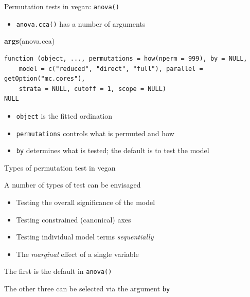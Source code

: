 \documentclass[10pt,ignorenonframetext,compress, aspectratio=169]{beamer}
\newenvironment{Shaded}{\begin{snugshade}}{\end{snugshade}}
\newcommand{\KeywordTok}[1]{\textcolor[rgb]{0.13,0.29,0.53}{\textbf{{#1}}}}
\newcommand{\NormalTok}[1]{{#1}}
\begin{document}
\begin{frame}[fragile]{Permutation tests in vegan: \texttt{anova()}}

\begin{itemize}
\itemsep1pt\parskip0pt
\item
  \texttt{anova.cca()} has a number of arguments
\end{itemize}

\tiny

\begin{Shaded}
\begin{Highlighting}[]
\KeywordTok{args}\NormalTok{(anova.cca)}
\end{Highlighting}
\end{Shaded}

\begin{verbatim}
function (object, ..., permutations = how(nperm = 999), by = NULL, 
    model = c("reduced", "direct", "full"), parallel = getOption("mc.cores"), 
    strata = NULL, cutoff = 1, scope = NULL) 
NULL
\end{verbatim}

\normalsize

\begin{itemize}
\itemsep1pt\parskip0pt
\item
  \texttt{object} is the fitted ordination
\item
  \texttt{permutations} controls what is permuted and how
\item
  \texttt{by} determines what is tested; the default is to test the
  model
\end{itemize}

\end{frame}

\begin{frame}{Types of permutation test in vegan}

A number of types of test can be envisaged

\begin{itemize}
\itemsep1pt\parskip0pt
\item
  Testing the overall significance of the model
\item
  Testing constrained (canonical) axes
\item
  Testing individual model terms \emph{sequentially}
\item
  The \emph{marginal} effect of a single variable
\end{itemize}

The first is the default in \texttt{anova()}

The other three can be selected via the argument \texttt{by}

\end{frame}
\end{document}
